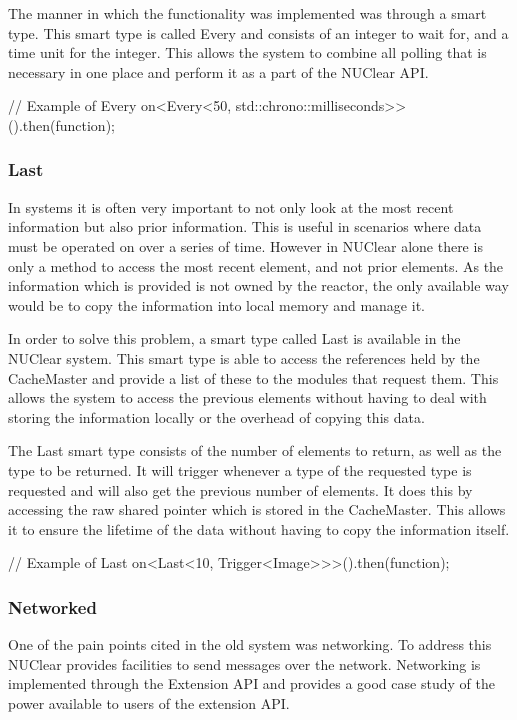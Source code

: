 \documentclass[english,12pt]{scrartcl}
\begin{document}
				The manner in which the functionality was implemented was through a smart type.
				This smart type is called Every and consists of an integer to wait for, and a time unit for the integer.
				This allows the system to combine all polling that is necessary in one place and perform it as a part of the NUClear API.

				\begin{cppcode}
				// Example of Every
				on<Every<50, std::chrono::milliseconds>>().then(function);
				\end{cppcode}

			\subsubsection{Last}
				In systems it is often very important to not only look at the most recent information but also prior information.
				This is useful in scenarios where data must be operated on over a series of time.
				However in NUClear alone there is only a method to access the most recent element, and not prior elements.
				As the information which is provided is not owned by the reactor, the only available way would be to copy the information into local memory and manage it.

				In order to solve this problem, a smart type called Last is available in the NUClear system.
				This smart type is able to access the references held by the CacheMaster and provide a list of these to the modules that request them.
				This allows the system to access the previous elements without having to deal with storing the information locally or the overhead of copying this data.

				The Last smart type consists of the number of elements to return, as well as the type to be returned.
				It will trigger whenever a type of the requested type is requested and will also get the previous number of elements.
				It does this by accessing the raw shared pointer which is stored in the CacheMaster.
				This allows it to ensure the lifetime of the data without having to copy the information itself.

				\begin{cppcode}
				// Example of Last
				on<Last<10, Trigger<Image>>>().then(function);
				\end{cppcode}

			\subsubsection{Networked}
				One of the pain points cited in the old system was networking.
				To address this NUClear provides facilities to send messages over the network.
				Networking is implemented through the Extension API and provides a good case study of the power available to users of the extension API.
\end{document}
